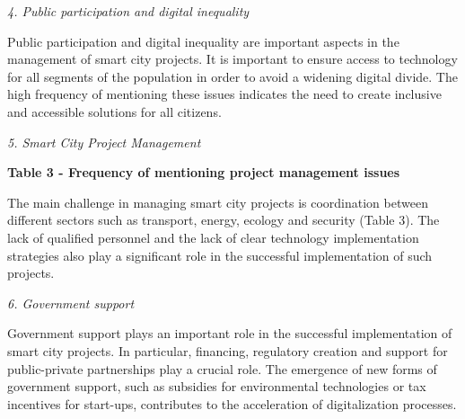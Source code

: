 \emph{4. Public participation and digital inequality}

Public participation and digital inequality are important aspects in the
management of smart city projects. It is important to ensure access to
technology for all segments of the population in order to avoid a
widening digital divide. The high frequency of mentioning these issues
indicates the need to create inclusive and accessible solutions for all
citizens.

\emph{5. Smart City Project Management}

{\bfseries Table 3 - Frequency of mentioning project management issues}


The main challenge in managing smart city projects is coordination
between different sectors such as transport, energy, ecology and
security (Table 3). The lack of qualified personnel and the lack of
clear technology implementation strategies also play a significant role
in the successful implementation of such projects.

\emph{6. Government support}

Government support plays an important role in the successful
implementation of smart city projects. In particular, financing,
regulatory creation and support for public-private partnerships play a
crucial role. The emergence of new forms of government support, such as
subsidies for environmental technologies or tax incentives for
start-ups, contributes to the acceleration of digitalization processes.

